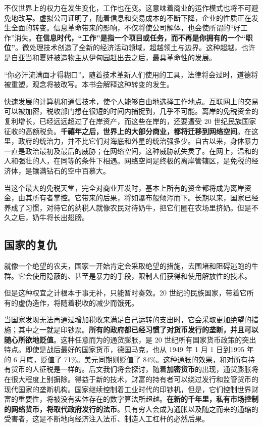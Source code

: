 不仅世界上的权力在发生变化，工作也在变。这意味着商业的运作模式也将不可避免地改写。虚拟公司证明了，随着信息和交易成本的不断下降，企业的性质正在发生全面的转变。信息革命带来的影响，不仅将使公司解体，也会使所谓的“好工作”消失。\textbf{在信息时代，“工作”是指一个项目或任务，而不再是你拥有的一个“职位”}。微处理技术创造了全新的经济活动领域，超越领土与边界。这种超越，也许是自亚当和夏娃被造物主从伊甸园赶出去之后，最具革命性的发展。


“你必汗流满面才得糊口”。随着技术革新人们使用的工具，法律将会过时，道德将被重塑，观念将被改写。本书会解释这种转变的发生。


快速发展的计算机和通信技术，使个人能够自由地选择工作地点。互联网上的交易可以被加密，税收部门想在很短的时间内捕捉到，几乎不可能。离岸的免税资金的复利增长，已经远远超过了在岸资产，而这些在岸的，还要遭受 20 世纪民族国家征收的高额税负。\textbf{千禧年之后，世界上的大部分商业，都将迁移到网络空间}。在这里，政府的统治力，并不比它们对海底和外星的统治强多少。自古以来，身体暴力一直是政治最初及最后的威胁；在网络空间，这种威胁就失灵了。在网上，温和的人和强壮的人，在同等的条件下相遇。网络空间是终极的离岸管辖区，是免税的经济体，是镶满钻石的空中百慕大。


当这个最大的免税天堂，完全对商业开发时，基本上所有的资金都将成为离岸资金，由其所有者掌控。它带来的后果，将如瀑布般倾泻而下。长期以来，国家已经养成了习惯，对待它的纳税人就像农民对待奶牛，把它们圈在农场里挤奶。但是不久之后，奶牛将长出翅膀。



\subsection{国家的复仇}
就像一个绝望的农夫，国家一开始肯定会采取绝望的措施，去围堵和阻碍逃跑的牛群。它会使用隐蔽的、甚至是暴力的手段，限制人们获得和使用解放性的技术。


但是这种权宜之计根本于事无补，只能暂时奏效。20 世纪的民族国家，带着它所有的虚伪造作，将随着税收的减少而饿死。


当国家发现无法再通过增加税收来满足自己运转的支出时，它会采取更加绝望的措施；其中之一就是印钞票。\textbf{所有的政府都已经习惯了对货币发行的垄断，并且可以随心所欲地贬值}。这种任意而为的通货膨胀，是 20 世纪所有国家货币政策的突出特点。即使是战后最好的国家货币，德国马克，也从 1949 年 1 月 1 日到1995 年的 6 月底，贬值了 71\%。美元同期则贬值了 84\%。这种通胀的效果，和对所有持有货币的人征税是一样的。后文我们将会探讨，随着\textbf{加密货币}的出现，通货膨胀将在很大程度上别摒除。得益于新的技术，财富的持有者可以绕过发行和监管货币的现代国家的垄断机构。国家继续控制着工业时代的印钞机，但是，它们控制世界财富的重要性，将被没有实体存在的数字算法所超越。\textbf{在新的千年里，私有市场控制的网络货币，将取代政府发行的法币}。只有穷人会成为通胀以及随之而来的通缩的受害者，这是不断地向经济注入法币、制造人工杠杆的必然后果。

